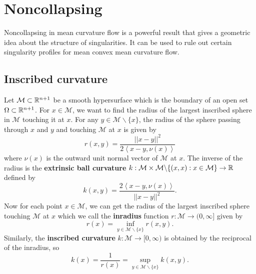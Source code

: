 \chapter{Noncollapsing}

Noncollapsing in mean curvature flow is a powerful result that gives a geometric idea about the structure of singularities. It can be used to rule out certain singularity profiles for mean convex mean curvature flow. 

\section{Inscribed curvature}

Let $ \mathcal{M} \subset \mathbb{R}^{n+1} $ be a smooth hypersurface which is the boundary of an open set $ \Omega \subset \mathbb{R}^{n+1} $. For $ x \in \mathcal{M} $, we want to find the radius of the largest inscribed sphere in $ \mathcal{M} $ touching it at $ x $. For any $ y \in \mathcal{M}\backslash \{x\} $, the radius of the sphere passing through $ x $ and $ y $ and touching $ \mathcal{M} $ at $ x $ is given by \begin{equation}
    r(x,y) = \frac{||x-y||^{2}}{2\left< x-y,\nu(x) \right>}
\end{equation}
where $ \nu(x) $ is the outward unit normal vector of $ \mathcal{M} $ at $ x $. The inverse of the radius is the \textbf{extrinsic ball curvature} $ k : \mathcal{M} \times \mathcal{M} \backslash \{(x,x) : x \in \mathcal{M}\} \to \mathbb{R} $ defined by \begin{equation}
    k(x,y) = \frac{2 \left< x-y,\nu(x) \right>}{||x-y||^{2}}.
\end{equation} 
Now for each point $ x \in \mathcal{M} $, we can get the radius of the largest inscribed sphere touching $ \mathcal{M} $ at $ x $  which we call the \textbf{inradius} function $r:  \mathcal{M}  \to (0,\infty]$ given by %
\begin{equation}
    r(x) = \inf_{{y \in \mathcal{M}\backslash \{x\}}} r(x,y).
\end{equation}
Similarly, the \textbf{inscribed curvature} $ k : \mathcal{M} \to [0, \infty) $  is obtained by the reciprocal of the inradius, so \begin{equation}
    k(x) = \frac{1}{r(x)} = \sup_{y \in \mathcal{M}\backslash \{x\}} k(x,y).%
\end{equation}
